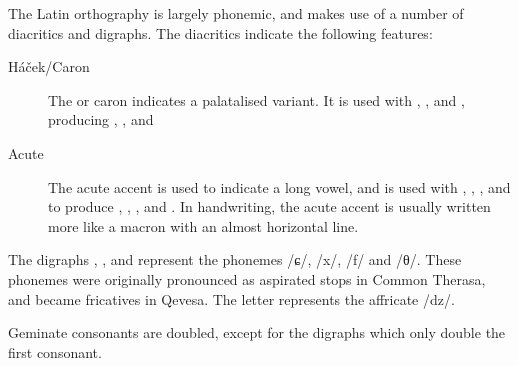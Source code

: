 \documentclass[grammar]{subfiles}
\begin{document}

The Latin orthography is largely phonemic, and makes use of a number of
diacritics and digraphs.  The diacritics indicate the following features:

\begin{description}
  \item[Háček/Caron] The  or caron indicates a palatalised
    variant.  It is used with , ,  and , producing ,
    ,  and   
  \item[Acute] The acute accent is used to indicate a long vowel, and is used
    with , , ,  and  to produce , , ,
     and .  In handwriting, the acute accent is usually written more
    like a macron with an almost horizontal line. 
\end{description}

The digraphs , ,  and  represent the phonemes /ɕ/, /x/, /f/ and
/θ/.  These phonemes were originally pronounced as aspirated stops in Common
Therasa, and became fricatives in Qevesa.  The letter  represents the
affricate /dz/.

Geminate consonants are doubled, except for the digraphs which only double the
first consonant.  


\end{document}
